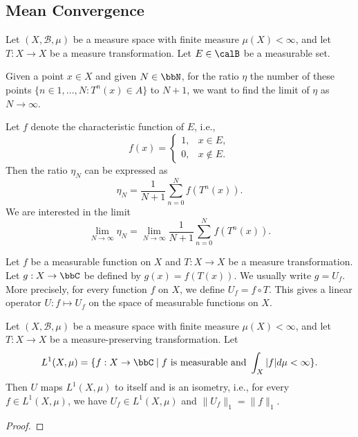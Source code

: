 \subsection{Mean Convergence}

    Let \((X, \mathcal{B}, \mu)\) be a measure space with finite measure \(\mu(X) < \infty\), and let \(T: X \to X\) be a measure transformation.
    Let \(E \in \calB\) be a measurable set.

    Given a point \(x \in X\) and given \(N \in \bbN\), for the ratio \(\eta\) the number of these points \(\{n \in 1,...,N: T^n(x) \in A\}\) to \(N+1\), we want to find the limit of \(\eta\) as \(N \to \infty\).

    Let \(f\) denote the characteristic function of \(E\), i.e.,
    \[
        f(x) = \begin{cases}
            1, & x \in E, \\
            0, & x \notin E.
        \end{cases}
    \]
    Then the ratio \(\eta_N\) can be expressed as
    \[
        \eta_N = \frac{1}{N+1} \sum_{n=0}^{N} f(T^n(x)).
    \]
    We are interested in the limit
    \[   \lim_{N \to \infty} \eta_N = \lim_{N \to \infty} \frac{1}{N+1} \sum_{n=0}^{N} f(T^n(x)). \]


    Let \(f\) be a measurable function on \(X\) and \(T: X \to X\) be a measure transformation.
    Let \(g:X \to \bbC\) be defined by \(g(x) = f(T(x))\).
    We usually write \(g = U_f\).
    More precisely, for every function \(f\) on \(X\), we define \(U_f = f \circ T\).
    This gives a linear operator \(U: f \mapsto U_f\) on the space of measurable functions on \(X\).

    \begin{proposition}\label{prop:U_isometry_on_L1}
        Let \((X, \mathcal{B}, \mu)\) be a measure space with finite measure \(\mu(X) < \infty\), and let \(T: X \to X\) be a measure-preserving transformation.
        Let \
        \[ L^1(X, \mu) = \{ f: X \to \bbC \mid f \text{ is measurable and } \int_X |f| d\mu < \infty \}. \]
        Then \(U\) maps \(L^1(X, \mu)\) to itself and is an isometry, 
        i.e., for every \(f \in L^1(X, \mu)\), we have \(U_f \in L^1(X, \mu)\) and \(\|U_f\|_1 = \|f\|_1\).
    \end{proposition}
    \begin{proof}
    \end{proof}
    
